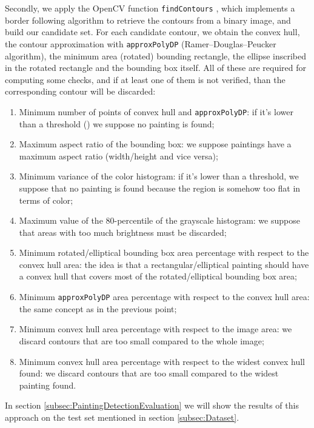 \documentclass[10pt,twocolumn,letterpaper]{article}
\begin{document}
Secondly, we apply the OpenCV function \texttt{findContours} \cite{journals/cvgip/SuzukiA85}, which implements a border following algorithm to retrieve the contours from a binary image, and build our candidate set.
For each candidate contour, we obtain the convex hull, the contour approximation with \texttt{approxPolyDP} \cite{approxPolyDP} (Ramer–Douglas–Peucker algorithm), the minimum area (rotated) bounding rectangle, the ellipse inscribed in the rotated rectangle and the bounding box itself. All of these are required for computing some checks, and if at least one of them is not verified, than the corresponding contour will be discarded:
\begin{enumerate}
    \item Minimum number of points of convex hull and \texttt{approxPolyDP}: if it's lower than a threshold () we suppose no painting is found;
    \item Maximum aspect ratio of the bounding box: we suppose paintings have a maximum aspect ratio (width/height and vice versa); 
    \item Minimum variance of the color histogram: if it's lower than a threshold, we suppose that no painting is found because the region is somehow too flat in terms of color;
    \item Maximum value of the 80-percentile of the grayscale histogram: we suppose that areas with too much brightness must be discarded;
    \item Minimum rotated/elliptical bounding box area percentage with respect to the convex hull area: the idea is that a rectangular/elliptical painting should have a convex hull that covers most of the rotated/elliptical bounding box area;
    \item Minimum \texttt{approxPolyDP} area percentage with respect to the convex hull area: the same concept as in the previous point;
    \item Minimum convex hull area percentage with respect to the image area: we discard contours that are too small compared to the whole image;
    \item Minimum convex hull area percentage with respect to the widest convex hull found: we discard contours that are too small compared to the widest painting found.
\end{enumerate}

In section \ref{subsec:PaintingDetectionEvaluation} we will show the results of this approach on the test set mentioned in section \ref{subsec:Dataset}.
\end{document}
